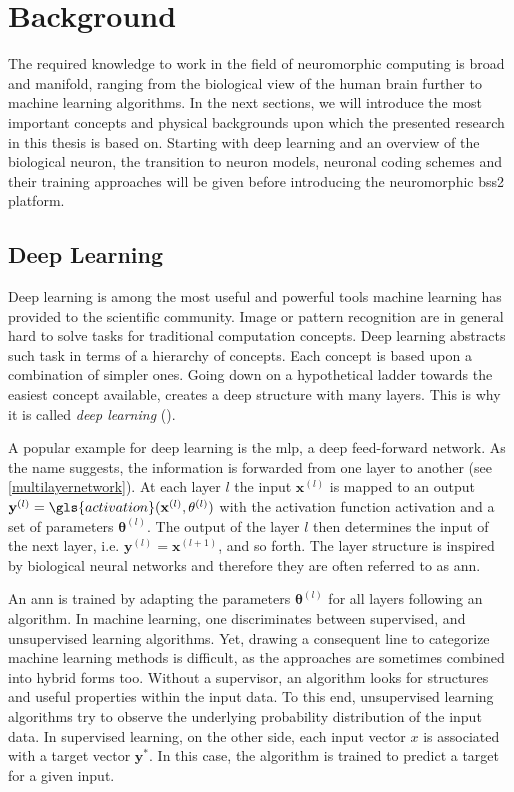 \chapter{Background}
The required knowledge to work in the field of neuromorphic computing is broad and manifold, ranging from the biological view of the human brain further to machine learning algorithms. In the next sections, we will introduce the most important concepts and physical backgrounds upon which the presented research in this thesis is based on. Starting with deep learning and an overview of the biological neuron, the transition to neuron models, neuronal coding schemes and their training approaches will be given before introducing the neuromorphic \gls{bss2} platform.
\section{Deep Learning}
\label{deeplearning}
Deep learning is among the most useful and powerful tools machine learning has provided to the scientific community. Image or pattern recognition are in general hard to solve tasks for traditional computation concepts. Deep learning abstracts such task in terms of a hierarchy of concepts. Each concept is based upon a combination of simpler ones. Going down on a hypothetical ladder towards the easiest concept available, creates a deep structure with many layers. This is why it is called \emph{deep learning} (\citealp{Goodfellow-et-al-2016}).

A popular example for deep learning is the \gls{mlp}, a deep feed-forward network. As the name suggests, the information is forwarded from one layer to another (see \cref{multilayernetwork}). At each layer $l$ the input $\mathbf{x}^{(l)}$ is mapped to an output $\mathbf{y}^{(l)} = \gls{activation}(\mathbf{x}^{(l)}, \mathbf{\theta}^{(l)})$ with the activation function \gls{activation} and a set of parameters $\mathbf{\theta}^{(l)}$. The output of the layer $l$ then determines the input of the next layer, i.e. $\mathbf{y}^{(l)} = \mathbf{x}^{(l+1)}$, and so forth. The layer structure is inspired by biological neural networks and therefore they are often referred to as \gls{ann}. 

An \gls{ann} is trained by adapting the parameters $\mathbf{\theta}^{(l)}$ for all layers following an algorithm. In machine learning, one discriminates between supervised, and unsupervised learning algorithms. Yet, drawing a consequent line to categorize machine learning methods is difficult, as the approaches are sometimes combined into hybrid forms too. Without a supervisor, an algorithm looks for structures and useful properties within the input data. To this end, unsupervised learning algorithms try to observe the underlying probability distribution of the input data. In supervised learning, on the other side, each input vector $x$ is associated with a target vector $\textbf{y}^*$. In this case, the algorithm is trained to predict a target for a given input.


